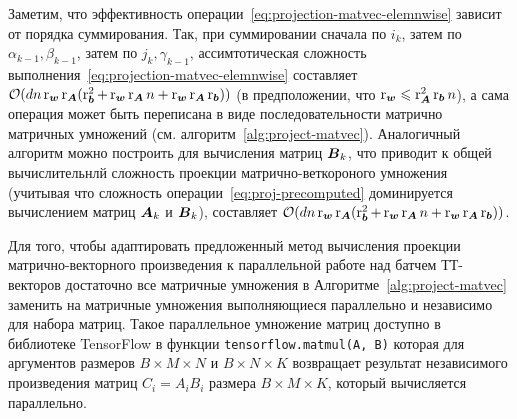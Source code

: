 Заметим, что эффективность операции~\eqref{eq:projection-matvec-elemnwise} зависит от порядка суммирования. Так, при суммировании сначала по $i_k$, затем по $\alpha_{k-1}, \beta_{k-1}$, затем по $j_k, \gamma_{k-1}$, ассимтотическая сложность выполнения~\eqref{eq:projection-matvec-elemnwise} составляет $\mathcal{O}(d n \operatorname{r}_{\boldsymbol{w}} \operatorname{r}_{\boldsymbol{A}}  (\operatorname{r}^2_{\boldsymbol{b}} + \operatorname{r}_{\boldsymbol{w}} \operatorname{r}_{\boldsymbol{A}} n + \operatorname{r}_{\boldsymbol{w}} \operatorname{r}_{\boldsymbol{A}} \operatorname{r}_{\boldsymbol{b}}))$ (в предположении, что $\operatorname{r}_{\boldsymbol{w}} \leqslant \operatorname{r}^2_{\boldsymbol{A}} \operatorname{r}_{\boldsymbol{b}} n$), а сама операция может быть переписана в виде последовательности матрично матричных умножений (см. алгоритм~\ref{alg:project-matvec}). Аналогичный алгоритм можно построить для вычисления матриц $\boldsymbol{B}_k$, что приводит к общей вычислительнлй сложность проекции матрично-веткороного умножения (учитывая что сложность операции~\eqref{eq:proj-precomputed} доминируется вычислением матриц $\boldsymbol{A}_k$ и $\boldsymbol{B}_k$), составляет $\mathcal{O}(d n \operatorname{r}_{\boldsymbol{w}} \operatorname{r}_{\boldsymbol{A}}  (\operatorname{r}^2_{\boldsymbol{b}} + \operatorname{r}_{\boldsymbol{w}} \operatorname{r}_{\boldsymbol{A}} n + \operatorname{r}_{\boldsymbol{w}} \operatorname{r}_{\boldsymbol{A}} \operatorname{r}_{\boldsymbol{b}}))$.

Для того, чтобы адаптировать предложенный метод вычисления проекции матрично-векторного произведения к параллельной работе над батчем ТТ-векторов достаточно все матричные умножения в Алгоритме~\ref{alg:project-matvec} заменить на матричные умножения выполняющиеся параллельно и независимо для набора матриц. Такое параллельное умножение матриц доступно в библиотеке TensorFlow в функции \texttt{tensorflow.matmul(A, B)} которая для аргументов размеров $B \times M \times N$ и $B \times N \times K$ возвращает результат независимого произведения матриц $C_i = A_i B_i$ размера $B \times M \times K$, который вычисляется параллельно.

